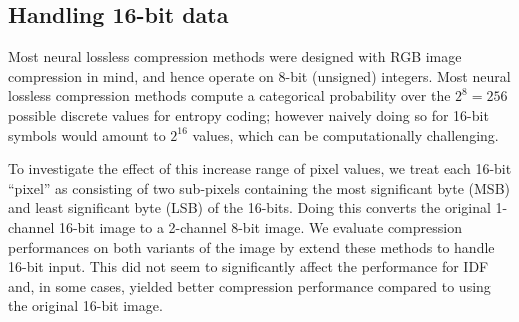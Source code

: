 \subsection{Handling 16-bit data}
\label{sec:handling16b}

Most neural lossless compression methods were designed with RGB image compression in mind, and hence operate on 8-bit (unsigned) integers. 
Most neural lossless compression methods compute a categorical probability over the $2^8=256$ possible discrete values for entropy coding; however naively doing so for 16-bit symbols would amount to $2^{16}$ values, which can be computationally challenging. 

To investigate the effect of this increase range of pixel values, we treat each 16-bit ``pixel'' as consisting of two sub-pixels containing the most significant byte (MSB) and least significant byte (LSB) of the 16-bits. Doing this converts the original 1-channel 16-bit image to a 2-channel 8-bit image. We evaluate compression performances on both variants of the image by extend these methods to handle 16-bit input. This did not seem to significantly affect the performance for IDF and, in some cases, yielded better compression performance compared to using the original 16-bit image.
\label{sec:traditional}